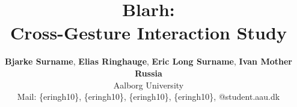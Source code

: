 
\title{Blarh:\\Cross-Gesture Interaction Study}
\author{
\textbf{Bjarke Surname}, 
\textbf{Elias Ringhauge}, 
\textbf{Eric Long Surname}, 
\textbf{Ivan Mother Russia}
\\Aalborg University
\\Mail: 
\{eringh10\},
\{eringh10\},
\{eringh10\},
\{eringh10\},
 @student.aau.dk}

\maketitle


